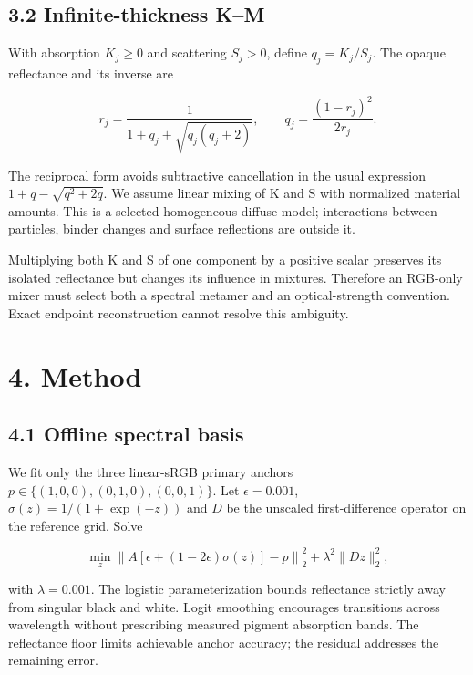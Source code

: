 \documentclass[
  10pt,
  twocolumn]{article}
\begin{document}
\hypertarget{infinite-thickness-km}{%
\subsection{3.2 Infinite-thickness K--M}\label{infinite-thickness-km}}

With absorption \(K_j\geq0\) and scattering \(S_j>0\), define
\(q_j=K_j/S_j\). The opaque reflectance and its inverse are

\[r_j=\frac{1}{1+q_j+\sqrt{q_j(q_j+2)}},\qquad q_j=\frac{(1-r_j)^2}{2r_j}.\]

The reciprocal form avoids subtractive cancellation in the usual
expression \(1+q-\sqrt{q^2+2q}\). We assume linear mixing of K and S
with normalized material amounts. This is a selected homogeneous diffuse
model; interactions between particles, binder changes and surface
reflections are outside it.

Multiplying both K and S of one component by a positive scalar preserves
its isolated reflectance but changes its influence in mixtures.
Therefore an RGB-only mixer must select both a spectral metamer and an
optical-strength convention. Exact endpoint reconstruction cannot
resolve this ambiguity.

\hypertarget{method}{%
\section{4. Method}\label{method}}

\hypertarget{offline-spectral-basis}{%
\subsection{4.1 Offline spectral basis}\label{offline-spectral-basis}}

We fit only the three linear-sRGB primary anchors
\(p\in\{(1,0,0),(0,1,0),(0,0,1)\}\). Let \(\epsilon=0.001\),
\(\sigma(z)=1/(1+\exp(-z))\) and \(D\) be the unscaled first-difference
operator on the reference grid. Solve

\[\min_z \left\|A[\epsilon+(1-2\epsilon)\sigma(z)]-p\right\|_2^2+\lambda^2\|Dz\|_2^2,\]

with \(\lambda=0.001\). The logistic parameterization bounds reflectance
strictly away from singular black and white. Logit smoothing encourages
transitions across wavelength without prescribing measured pigment
absorption bands. The reflectance floor limits achievable anchor
accuracy; the residual addresses the remaining error.
\end{document}
